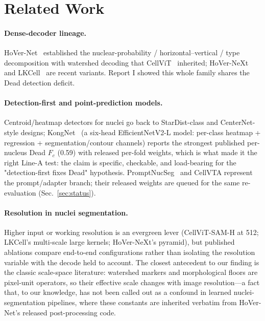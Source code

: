 \documentclass[11pt]{article}
\begin{document}
\section{Related Work}
\label{sec:related}

\paragraph{Dense-decoder lineage.} HoVer-Net~\cite{graham2019hovernet} established the
nuclear-probability / horizontal--vertical / type decomposition with watershed decoding that
CellViT~\cite{horta2024cellvit} inherited; HoVer-NeXt~\cite{hovenext} and
LKCell~\cite{cui2024lkcell} are recent variants. Report I showed this whole family shares the
Dead detection deficit.

\paragraph{Detection-first and point-prediction models.} Centroid/heatmap detectors for
nuclei go back to StarDist-class and CenterNet-style designs; KongNet~\cite{lv2025kongnet}
(a six-head EfficientNetV2-L model: per-class heatmap + regression + segmentation/contour
channels) reports the strongest published per-nucleus Dead $F_c$ (0.59) with released
per-fold weights, which is what made it the right Line-A test: the claim is specific,
checkable, and load-bearing for the "detection-first fixes Dead" hypothesis.
PromptNucSeg~\cite{promptnucseg} and CellVTA represent the prompt/adapter branch; their
released weights are queued for the same re-evaluation (Sec.~\ref{sec:status}).

\paragraph{Resolution in nuclei segmentation.} Higher input or working resolution is an
evergreen lever (CellViT-SAM-H at 512; LKCell's multi-scale large kernels; HoVer-NeXt's
pyramid), but published ablations compare end-to-end configurations rather than isolating
the resolution variable with the decode held to account. The closest antecedent to our
finding is the classic scale-space literature: watershed markers and morphological floors
are pixel-unit operators, so their effective scale changes with image resolution---a fact
that, to our knowledge, has not been called out as a confound in learned
nuclei-segmentation pipelines, where these constants are inherited verbatim from HoVer-Net's
released post-processing code.
\end{document}
